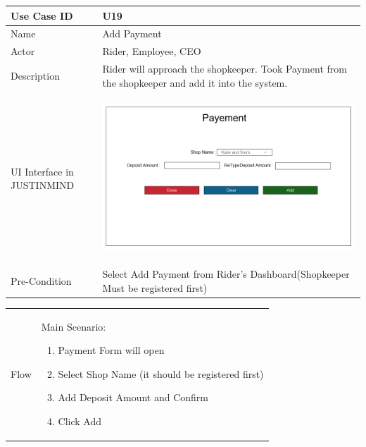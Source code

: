 \documentclass[12pt,a4paper]{report}
\begin{document}
\begin{tabular}{ | m{3cm} | m{12cm}| } \hline

Use Case ID &  U19 \\\hline

Name  	    & Add  Payment  \\ \hline

Actor     	& Rider, Employee, CEO \\ \hline

Description & Rider will approach the shopkeeper. Took Payment from the shopkeeper and add it into the system. \\ \hline

UI Interface in JUSTINMIND & \begin{center} \includegraphics[scale=0.3]{./UIs for Latex Reports/UI-026 Add Payment@1x.png}\end{center}  \\ \hline

Pre-Condition &  Select Add Payment from Rider’s Dashboard(Shopkeeper Must be registered first) \\ \hline

\end{tabular} \newpage \begin{tabular}{ | m{3cm} | m{12cm}| }  \hline
Flow & Main Scenario:

\begin{enumerate}
\item   Payment Form will open
\item   Select Shop Name (it should be registered first)
\item   Add Deposit Amount and Confirm
\item   Click Add


\end{enumerate}


\end{tabular}
\end{document}
